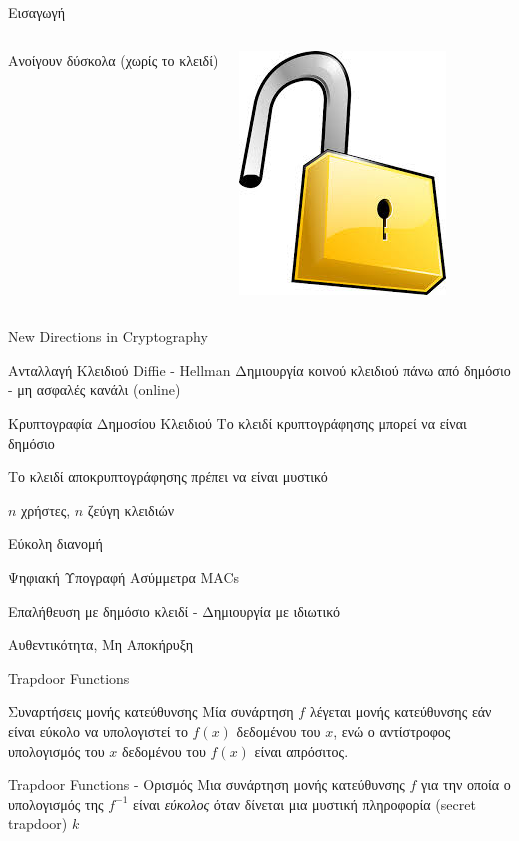 \documentclass[handout]{beamer}
\begin{document}
\begin{frame}[allowframebreaks]{Εισαγωγή}
\begin{columns}
\begin{small}
Aνοίγουν δύσκολα (χωρίς το κλειδί)
 
\end{small}
\includegraphics[scale=0.3]{padlock.jpg}
\end{columns}

\end{frame}

\begin{frame}{New Directions in Cryptography}

\begin{block}{Ανταλλαγή Κλειδιού Diffie - Hellman}
Δημιουργία κοινού κλειδιού πάνω από δημόσιο - μη ασφαλές κανάλι (online)
\end{block}

\begin{block}{Κρυπτογραφία Δημοσίου Κλειδιού}
Το κλειδί κρυπτογράφησης μπορεί να είναι δημόσιο

Το κλειδί αποκρυπτογράφησης πρέπει να είναι μυστικό

$n$ χρήστες, $n$ ζεύγη κλειδιών

Εύκολη διανομή
\end{block}

\begin{block}{Ψηφιακή Υπογραφή}
Ασύμμετρα MACs

Επαλήθευση με δημόσιο κλειδί - Δημιουργία με ιδιωτικό

Αυθεντικότητα, Μη Αποκήρυξη 
\end{block}

\end{frame}

\begin{frame}{Trapdoor Functions}

\begin{block}{Συναρτήσεις μονής κατεύθυνσης}
Μία συνάρτηση $f$  λέγεται μονής κατεύθυνσης εάν είναι εύκολο να υπολογιστεί το $f(x)$ δεδομένου του $x$, ενώ ο αντίστροφος υπολογισμός του $x$ δεδομένου του $f(x)$ είναι απρόσιτος.
\end{block}
\pause

\begin{block}{Trapdoor Functions - Ορισμός}
Mια συνάρτηση μονής κατεύθυνσης $f$ για την οποία ο υπολογισμός της $f^{−1}$ είναι \emph{εύκολος} όταν δίνεται μια μυστική πληροφορία (secret trapdoor) $k$
\end{block}

\end{frame}
\end{document}
